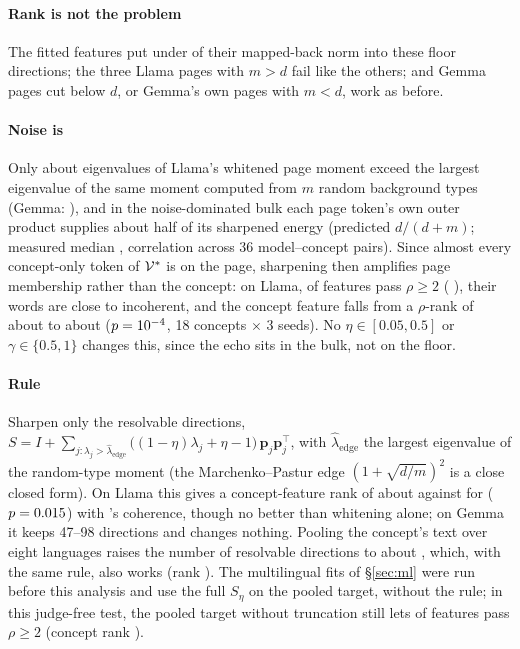 \paragraph{Rank is not the problem}
The fitted features put under  of their mapped-back norm into these floor directions; the three Llama pages with $m > d$ fail like the others; and Gemma pages cut below $d$, or Gemma's own pages with $m < d$, work as before.

\paragraph{Noise is}
Only about  eigenvalues of Llama's whitened page moment exceed the largest eigenvalue of the same moment computed from $m$ random background types (Gemma: ), and in the noise-dominated bulk each page token's own outer product supplies about half of its sharpened energy (predicted $d/(d+m)$; measured median , correlation  across 36 model--concept pairs).
Since almost every concept-only token of $\mathcal{V}^*$ is on the page, sharpening then amplifies page membership rather than the concept: on Llama,  of features pass $\rho \ge 2$ (\ember{} ), their words are close to incoherent, and the concept feature falls from a $\rho$-rank of about  to about  ($p = 10^{-4}$, 18 concepts $\times$ 3 seeds).
No $\eta \in [0.05, 0.5]$ or $\gamma \in \{0.5, 1\}$ changes this, since the echo sits in the bulk, not on the floor.

\paragraph{Rule}
Sharpen only the resolvable directions, $S = I + \sum_{j:\lambda_j > \hat\lambda_{\text{edge}}} \big((1-\eta)\lambda_j + \eta - 1\big)\,\mathbf p_j\mathbf p_j^{\top}$, with $\hat\lambda_{\text{edge}}$ the largest eigenvalue of the random-type moment (the Marchenko--Pastur edge $(1+\sqrt{d/m})^2$ is a close closed form).
On Llama this gives a concept-feature rank of about  against  for \ember{} ($p = 0.015$) with \ember{}'s coherence, though no better than whitening alone; on Gemma it keeps 47--98 directions and changes nothing.
Pooling the concept's text over eight languages raises the number of resolvable directions to about , which, with the same rule, also works (rank ).
The multilingual fits of \S\ref{sec:ml} were run before this analysis and use the full $S_\eta$ on the pooled target, without the rule; in this judge-free test, the pooled target without truncation still lets  of features pass $\rho \ge 2$ (concept rank ).
